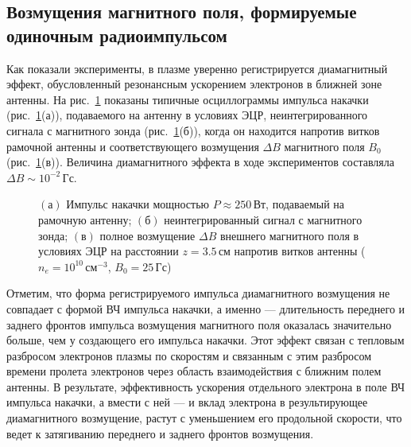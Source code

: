 \documentclass[autoref,10pt]{disser}
\begin{document}
\subsection{Возмущения магнитного поля, формируемые одиночным радиоимпульсом}
Как показали эксперименты, в плазме уверенно регистрируется диамагнитный эффект, обусловленный резонансным ускорением электронов в ближней зоне антенны. На \mbox{рис.~\ref{fig:pump}} показаны типичные осциллограммы импульса накачки (\mbox{рис.~\ref{fig:pump}}(а)), подаваемого на антенну в условиях ЭЦР, неинтегрированного сигнала с магнитного зонда (\mbox{рис.~\ref{fig:pump}}(б)),  когда он находится напротив витков рамочной антенны  и соответствующего возмущения $\Delta{}B$ магнитного поля $B_{0}$ (\mbox{рис.~\ref{fig:pump}}(в)). Величина диамагнитного эффекта в ходе экспериментов составляла $\Delta{}B\sim{}10^{-2}$\,Гс.
\begin{figure}[H]
  \centering
  \def\svgwidth{0.6\columnwidth} %
  
  \caption{$(а)$ Импульс накачки мощностью $P\approx{}250$\,Вт, подаваемый на рамочную антенну; $(б)$ неинтегрированный сигнал с магнитного зонда; $(в)$ полное возмущение $\Delta{}B$ внешнего магнитного поля в условиях ЭЦР на расстоянии $z=3.5$\,см напротив витков антенны ($n_{e}=10^{10}$\,см$^{-3}$, $B_{0} = 25$\,Гс)}
  \label{fig:pump}
\end{figure}

Отметим, что форма регистрируемого импульса диамагнитного возмущения не совпадает с формой ВЧ импульса накачки, а именно --- длительность переднего и заднего фронтов импульса возмущения магнитного поля  оказалась значительно больше, чем у создающего его импульса накачки.  Этот эффект связан с тепловым разбросом электронов плазмы по скоростям и связанным с этим разбросом времени пролета электронов через область взаимодействия с ближним полем антенны. В результате, эффективность ускорения отдельного электрона в поле ВЧ импульса накачки, а вмести с ней --- и вклад электрона в результирующее диамагнитного возмущение, растут с уменьшением его продольной скорости, что ведет к затягиванию переднего и заднего фронтов возмущения. 
\end{document}
